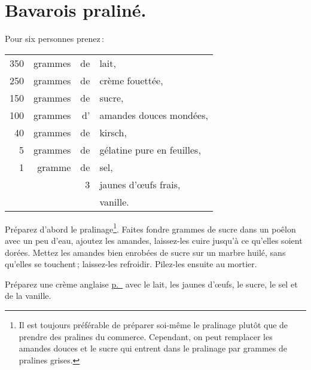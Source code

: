 \section*{\centering Bavarois praliné.}
{}

Pour six personnes prenez :

\footnotesize
\begin{longtable}{rrrp{16em}}
    350 & grammes & de & lait,                                                                            \\
    250 & grammes & de & crème fouettée,                                                                  \\
    150 & grammes & de & sucre,                                                                           \\
    100 & grammes & d' & amandes douces mondées,                                                          \\
     40 & grammes & de & kirsch,                                                                          \\
      5 & grammes & de & gélatine pure en feuilles,                                                       \\
      1 & gramme  & de & sel,                                                                             \\
        &         &  3 & jaunes d'œufs frais,                                                             \\
        &         &    & vanille.                                                                         \\
\end{longtable}
\normalsize

Préparez d'abord le pralinage\footnote{Il est toujours préférable de préparer
soi-même le pralinage plutôt que de prendre des pralines du commerce.
Cependant, on peut remplacer les amandes douces et le sucre qui entrent dans le
pralinage par {\mmm} grammes de pralines grises.}. Faites fondre
{\mmm} grammes de sucre dans un poêlon avec un peu d'eau, ajoutez les
amandes, laissez-les cuire jusqu'à ce qu'elles soient dorées. Mettez les
amandes bien enrobées de sucre sur un marbre huilé, sans qu'elles se touchent ;
laissez-les refroidir. Pilez-les ensuite au mortier.

Préparez une crème anglaise \hyperlink{p0856}{p. \pageref{pg0856}} avec le lait,
les jaunes d'œufs, le sucre, le sel et de la vanille.

